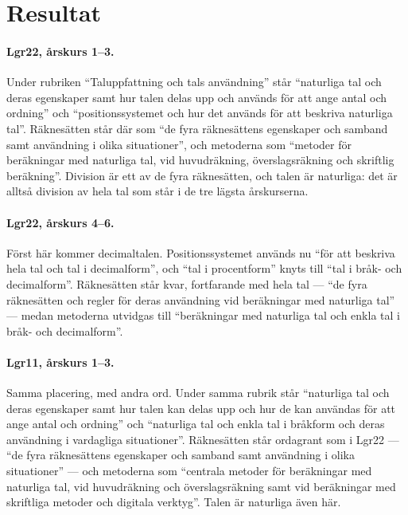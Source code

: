 \section{Resultat}
\label{sec:lgr22-resultat}

\paragraph{Lgr22, årskurs 1--3.}
Under rubriken \enquote{Taluppfattning och tals användning} står
\enquote{naturliga tal och deras egenskaper samt hur talen delas upp
och används för att ange antal och ordning} och
\enquote{positionssystemet och hur det används för att beskriva
naturliga tal}.  Räknesätten står där som \enquote{de fyra räknesättens
egenskaper och samband samt användning i olika situationer}, och
metoderna som \enquote{metoder för beräkningar med naturliga tal, vid
huvudräkning, överslagsräkning och skriftlig
beräkning}\autocite[55]{Skolverket2022Lgr22}.  Division är ett av de
fyra räknesätten, och talen är naturliga: det är alltså division av
hela tal som står i de tre lägsta årskurserna.

\paragraph{Lgr22, årskurs 4--6.}
Först här kommer decimaltalen.  Positionssystemet används nu
\enquote{för att beskriva hela tal och tal i decimalform}, och
\enquote{tal i procentform} knyts till \enquote{tal i bråk- och
decimalform}\autocite[56]{Skolverket2022Lgr22}.  Räknesätten står kvar,
fortfarande med hela tal --- \enquote{de fyra räknesätten och regler
för deras användning vid beräkningar med naturliga tal} --- medan
metoderna utvidgas till \enquote{beräkningar med naturliga tal och
enkla tal i bråk- och
decimalform}\autocite[57]{Skolverket2022Lgr22}.

\paragraph{Lgr11, årskurs 1--3.}
Samma placering, med andra ord.  Under samma rubrik står
\enquote{naturliga tal och deras egenskaper samt hur talen kan delas upp
och hur de kan användas för att ange antal och ordning} och
\enquote{naturliga tal och enkla tal i bråkform och deras användning i
vardagliga situationer}.  Räknesätten står ordagrant som i Lgr22 ---
\enquote{de fyra räknesättens egenskaper och samband samt användning i
olika situationer} --- och metoderna som \enquote{centrala metoder för
beräkningar med naturliga tal, vid huvudräkning och överslagsräkning
samt vid beräkningar med skriftliga metoder och digitala
verktyg}\autocite[55]{Skolverket2019Lgr11}.  Talen är naturliga även
här.

